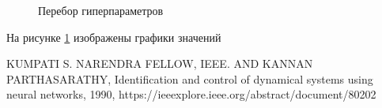 \documentclass[12pt, oneside]{extbook}
\begin{document}
\begin{flushleft}
\begin{figure}[!ht]
{     }
     \hfill
     \centering
     \caption{Перебор гиперпараметров}
     \label{fig:multi_perceptron_search}
\end{figure}
На рисунке \ref{fig:multi_perceptron_search} изображены графики значений 

\begin{thebibliography}{1}
 KUMPATI S. NARENDRA FELLOW, IEEE. AND KANNAN  PARTHASARATHY, Identification and control of dynamical systems using neural networks, 1990, https://ieeexplore.ieee.org/abstract/document/80202
\end{thebibliography}
\end{flushleft}
\end{document}
